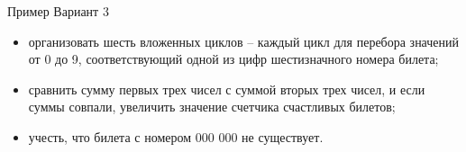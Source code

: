 \documentclass{beamer}
\begin{document}
\begin{frame}{Пример}
Вариант 3
\begin{itemize}
\item организовать шесть вложенных циклов – каждый цикл для перебора значений от 0 до 9, соответствующий одной из цифр шестизначного номера билета;
\item сравнить сумму первых трех чисел с суммой вторых трех чисел, и если суммы совпали, увеличить значение счетчика счастливых билетов;
\item учесть, что билета с номером 000 000 не существует.
\end{itemize}
\end{frame}
\end{document}

